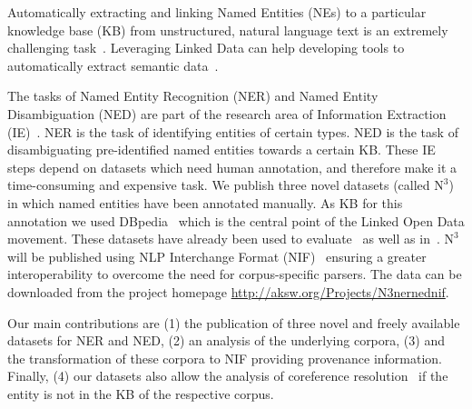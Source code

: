 

Automatically extracting and linking Named Entities (NEs) to a particular knowledge base (KB) from unstructured, natural language text is an extremely challenging task~\cite{Cucerzan07}. 
Leveraging Linked Data can help developing tools to automatically extract semantic data~\cite{GER+13,AIDA,spotlight,agdistis_iswc}.

The tasks of Named Entity Recognition (NER) and Named Entity Disambiguation (NED) are part of the research area of Information Extraction (IE)~\cite{FOX}.
NER is the task of identifying entities of certain types.
NED is the task of disambiguating pre-identified named entities towards a certain KB.
These IE steps depend on datasets which need human annotation, and therefore make it a time-consuming and expensive task.
We publish three novel datasets (called $\mbox{N}^3$) in which named entities have been annotated manually. As KB for this annotation we used DBpedia~\cite{dbpedia_iswc} which is the central point of the Linked Open Data movement. These datasets have already been used to evaluate~\cite{AIDA,spotlight} as well as in~\cite{GER+13,agdistis_iswc}.
$\mbox{N}^3$ will be published using NLP Interchange Format (NIF)~\cite{ISWC2013NIF} ensuring a greater interoperability to overcome the need for corpus-specific parsers. 
The data can be downloaded from the project homepage \url{http://aksw.org/Projects/N3nernednif}.

Our main contributions are
(1) the publication of three novel and freely available datasets for NER and NED,
(2) an analysis of the underlying corpora,
(3) and the transformation of these corpora to NIF providing provenance information.
Finally, (4) our datasets also allow the analysis of coreference resolution~\cite{singh} if the entity is not in the KB of the respective corpus.

